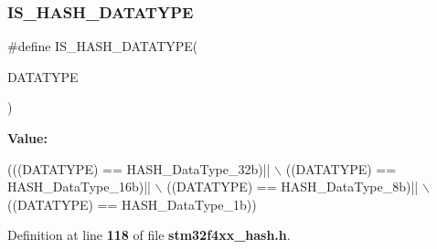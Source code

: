 \mbox{\label{group__HASH__Data__Type_ga51d13da6165bc0e2075f3653881aa89a}} 
\subsubsection{I\+S\+\_\+\+H\+A\+S\+H\+\_\+\+D\+A\+T\+A\+T\+Y\+PE}
{\footnotesize\ttfamily \#define I\+S\+\_\+\+H\+A\+S\+H\+\_\+\+D\+A\+T\+A\+T\+Y\+PE(\begin{DoxyParamCaption}\item[{}]{D\+A\+T\+A\+T\+Y\+PE }\end{DoxyParamCaption})}

{\bfseries Value\+:}
\begin{DoxyCode}
(((DATATYPE) == HASH_DataType_32b)|| \(\backslash\)
                                    ((DATATYPE) == HASH_DataType_16b)|| \(\backslash\)
                                    ((DATATYPE) == HASH_DataType_8b)|| \(\backslash\)
                                    ((DATATYPE) == HASH_DataType_1b))
\end{DoxyCode}


Definition at line \textbf{ 118} of file \textbf{ stm32f4xx\+\_\+hash.\+h}.

